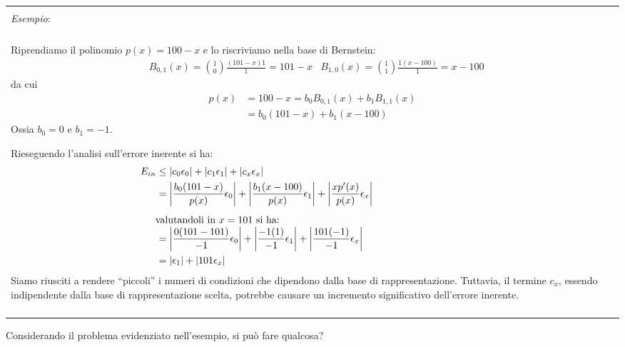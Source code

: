 \documentclass{article}
\numberwithin{equation}{section}
\newenvironment{example}
{\begin{center}
        \begin{tabular}{|p{0.9\textwidth}|}
            \hline \\ 
            \textit{Esempio}: \\\\ 
        }
        {
            \\\\ \hline
        \end{tabular}
    \end{center}
}
\newcommand{\alignedintertext}[1]{%
  \noalign{%
    \vskip\belowdisplayshortskip
    \vtop{\hsize=\linewidth#1\par
    \expandafter}%
    \expandafter\prevdepth\the\prevdepth
  }%
}
\begin{document}
\begin{example}
   Riprendiamo il polinomio $p(x)=100-x$ e lo riscriviamo nella base di
   Bernstein:
   \begin{equation*}
       \begin{aligned}
           & B_{0,1}(x)=\binom{1}{0}\frac{(101-x)1}{1}=101-x &
           B_{1,0}(x)=\binom{1}{1}\frac{1(x-100)}{1}=x-100
       \end{aligned}
   \end{equation*}
   da cui 
   \begin{equation*}
       \begin{aligned}
           p(x)&=100-x=b_0B_{0,1}(x)+b_1B_{1,1}(x)\\
               &=b_0(101-x)+b_1(x-100)
       \end{aligned}
   \end{equation*}
   Ossia $b_0=0$ e $b_1=-1$.
   
   Rieseguendo l'analisi sull'errore inerente si ha:
   \begin{equation*}
       \begin{aligned}
           E_{in}&\leq \left\lvert c_0\epsilon_0 \right\rvert 
            + \left\lvert c_1\epsilon_1\right\rvert 
            + \left\lvert c_x\epsilon_x\right\rvert\\
                 &= \left\lvert \frac{b_0(101-x)}{p(x)}\epsilon_0\right\rvert
                 + \left\lvert \frac{b_1(x-100)}{p(x)}\epsilon_1\right\rvert
             + \left\lvert \frac{xp'(x)}{p(x)}\epsilon_x\right\rvert \\
             \alignedintertext{valutandoli in $x=101$ si ha:}
                 &=\left\lvert \frac{0(101-101)}{-1}\epsilon_0\right\rvert + 
                 \left\lvert \frac{-1(1)}{-1}\epsilon_1\right\rvert +
                 \left\lvert \frac{101(-1)}{-1}\epsilon_x\right\rvert \\ 
                 &= \left\lvert \epsilon_1 \right\rvert + \left\lvert
                 101\epsilon_x\right\rvert
       \end{aligned}
   \end{equation*}
   Siamo riusciti a rendere ``piccoli'' i numeri di condizioni che dipendono
   dalla base di rappresentazione. Tuttavia, il termine $c_x$, essendo
   indipendente dalla base di rappresentazione scelta, potrebbe causare un
   incremento significativo dell'errore inerente.
\end{example}
Considerando il problema evidenziato nell'esempio, si può fare qualcosa?
\end{document}
